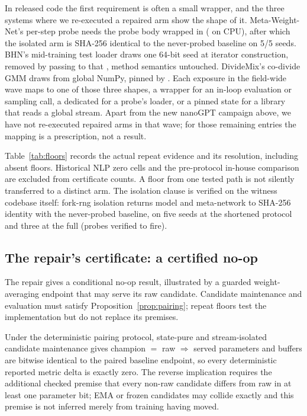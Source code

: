 \noindent In released code the first requirement is often a small wrapper, and the
three systems where we re-executed a repaired arm show the shape of it.
Meta-Weight-Net's per-step probe needs the probe body wrapped in
 ( on
CPU), after which the isolated arm
is SHA-256 identical to the never-probed baseline on 5/5 seeds. BHN's
mid-training test loader draws one 64-bit seed at iterator construction, removed
by passing  to that
, method semantics untouched. DivideMix's co-divide GMM draws
from global NumPy, pinned by . Each
exposure in the field-wide wave maps to one of those three shapes, a
 wrapper for an in-loop evaluation or sampling call, a
dedicated  for a probe's loader, or a pinned state for a
library that reads a global stream. Apart from the new nanoGPT campaign
above, we have not re-executed repaired arms in that wave; for those
remaining entries the mapping is a prescription, not a result.

\noindent Table~\ref{tab:floors} records the actual repeat evidence and its
resolution, including absent floors. Historical NLP zero cells and the
pre-protocol in-house comparison are excluded from certificate counts.
A floor from one tested path is not silently transferred to a distinct arm.
The isolation clause is verified on the witness codebase itself:
fork-rng isolation returns model and meta-network to SHA-256 identity with
the never-probed baseline, on five seeds at the shortened protocol and three
at the full (probes verified to fire).

\subsection{The repair's certificate: a certified no-op}
\label{sec:receipt}

The repair gives a conditional no-op result, illustrated by a guarded
weight-averaging endpoint that may serve its raw candidate. Candidate
maintenance and evaluation must satisfy Proposition~\ref{prop:pairing};
repeat floors test the implementation but do not replace its premises.

\begin{corollary}[Certified no-op]
\label{cor:noop}
Under the deterministic pairing protocol, state-pure and stream-isolated
candidate maintenance gives champion $=$ raw $\Rightarrow$ served parameters
and buffers are bitwise identical to the paired baseline endpoint, so every
deterministic reported metric delta is exactly zero. The reverse implication
requires the additional checked premise that every non-raw candidate differs
from raw in at least one parameter bit; EMA or frozen candidates may collide
exactly and this premise is not inferred merely from training having moved.
\end{corollary}

